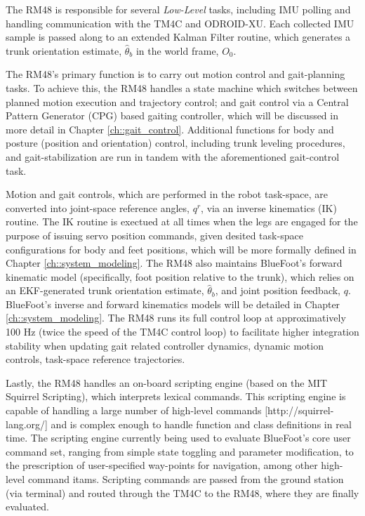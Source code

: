 			The RM48 is responsible for several \emph{Low-Level} tasks, including IMU polling and handling communication with the TM4C and ODROID-XU. Each collected IMU sample is passed along to an extended Kalman Filter routine, which generates a trunk orientation estimate, $\hat{\theta}_{b}$ in the world frame, $O_{0}$. 

			The RM48's primary function is to carry out motion control and gait-planning tasks. To achieve this, the RM48 handles a state machine which switches between planned motion execution and trajectory control; and gait control via a Central Pattern Generator (CPG) based gaiting controller, which will be discussed in more detail in Chapter \ref{ch::gait_control}. Additional functions for body and posture (position and orientation) control, including trunk leveling procedures, and gait-stabilization are run in tandem with the aforementioned gait-control task.

			Motion and gait controls, which are performed in the robot task-space, are converted into joint-space reference angles, $q^{r}$, via an inverse kinematics (IK) routine. The IK routine is exectued at all times when the legs are engaged for the purpose of issuing servo position commands, given desited task-space configurations for body and feet positions, which will be more formally defined in Chapter \ref{ch::system_modeling}. The RM48 also maintains BlueFoot's forward kinematic model (specifically, foot position relative to the trunk), which relies on an EKF-generated trunk orientation estimate, $\hat{\theta}_{b}$, and joint position feedback, $q$. BlueFoot's inverse and forward kinematics models will be detailed in Chapter \ref{ch::system_modeling}. The RM48 runs its full control loop at approximatively 100 Hz (twice the speed of the TM4C control loop) to facilitate higher integration stability when updating gait related controller dynamics, dynamic motion controls, task-space reference trajectories.

			Lastly, the RM48 handles an on-board scripting engine (based on the MIT Squirrel Scripting), which interprets lexical commands. This scripting engine is capable of handling a large number of high-level commands [http://squirrel-lang.org/] and is complex enough to handle function and class definitions in real time. The scripting engine currently being used to evaluate BlueFoot's core user command set, ranging from simple state toggling and parameter modification, to the prescription of user-specified way-points for navigation, among other high-level command itams. Scripting commands are passed from the ground station (via terminal) and routed through the TM4C to the RM48, where they are finally evaluated.


